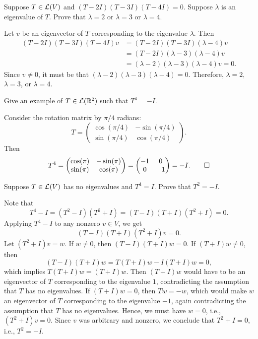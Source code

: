 \begin{exc}
\begin{exercise}
Suppose $T\in\mathcal{L}(V)$ and $(T-2I)(T-3I)(T-4I)=0$. Suppose $\lambda$ is an
eigenvalue of $T$. Prove that $\lambda=2$ or $\lambda=3$ or $\lambda=4$.
\end{exercise}
\begin{solution}
Let $v$ be an eigenvector of $T$ corresponding to the eigenvalue $\lambda$.
Then
\begin{align*}
(T-2I)(T-3I)(T-4I)v &= (T-2I)(T-3I)(\lambda-4)v\\
  &= (T-2I)(\lambda-3)(\lambda-4)v\\
  &= (\lambda-2)(\lambda-3)(\lambda-4)v = 0.
\end{align*}
Since $v\ne0$, it must be that $(\lambda-2)(\lambda-3)(\lambda-4)=0$.
Therefore, $\lambda=2$, $\lambda=3$, or $\lambda=4$.
\end{solution}

\begin{exercise}
Give an example of $T\in\mathcal{L}(\mathbb{R}^2)$ such that $T^4=-I$.
\end{exercise}
\begin{solution}
Consider the rotation matrix by $\pi/4$ radians:
\[ T = \begin{pmatrix} \cos(\pi/4) & -\sin(\pi/4)\\
   \sin(\pi/4) & \cos(\pi/4) \end{pmatrix}. \]
Then
\[ T^4 = \begin{pmatrix} \cos(\pi) & -\sin(\pi)\\ \sin(\pi) & \cos(\pi)
   \end{pmatrix} = \begin{pmatrix} -1&0\\ 0&-1 \end{pmatrix} = -I. \qedhere \]
\end{solution}

\begin{exercise}
Suppose $T\in\mathcal{L}(V)$ has no eigenvalues and $T^4=I$. Prove that $T^2=-I$.
\end{exercise}
\begin{solution}
Note that
\[ T^4-I = (T^2-I)(T^2+I) = (T-I)(T+I)(T^2+I) = 0. \]
Applying $T^4-I$ to any nonzero $v\in V$, we get
\[ (T-I)(T+I)(T^2+I)v = 0. \]
Let $(T^2+I)v=w$. If $w\ne0$, then $(T-I)(T+I)w=0$. If $(T+I)w\ne0$, then
\[ (T-I)(T+I)w = T(T+I)w-I(T+I)w = 0, \]
which implies $T(T+I)w=(T+I)w$. Then $(T+I)w$ would have to be an eigenvector
of $T$ corresponding to the eigenvalue $1$, contradicting the assumption that
$T$ has no eigenvalues. If $(T+I)w=0$, then $Tw=-w$, which would make $w$ an
eigenvector of $T$ corresponding to the eigenvalue $-1$, again contradicting
the assumption that $T$ has no eigenvalues. Hence, we must have $w=0$, i.e.,
$(T^2+I)v=0$. Since $v$ was arbitrary and nonzero, we conclude that
$T^2+I=0$, i.e., $T^2=-I$.
\end{solution}


\end{exc}
